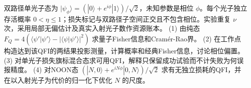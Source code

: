 双路径单光子态为 \(|\psi_\phi\rangle=(|0\rangle+e^{i\phi}|1\rangle)/\sqrt2\)，未知参数是相位 \(\phi\)。每个光子独立存活概率 \(0<\eta\le1\)；损失标记与双路径子空间正交且不包含相位。实验重复 \(\nu\) 次，采用局部无偏估计及真实入射光子数作资源账本。
(1) 由纯态 \(F_Q=4(\langle\psi'|\psi'\rangle-|\langle\psi|\psi'\rangle|^2)\) 求量子Fisher信息和Cramér-Rao界。
(2) 在工作点构造达到该QFI的两结果投影测量，计算概率和经典Fisher信息，讨论相位偏置。
(3) 对单光子损失旗标混合态求可用QFI，解释只保留成功试验而不计失败为何误报精度。
(4) 对NOON态 \((|N,0\rangle+e^{iN\phi}|0,N\rangle)/\sqrt2\) 求有无独立损耗的QFI，并在以入射光子为代价的归一化下优化 \(N\) 的尺度。
